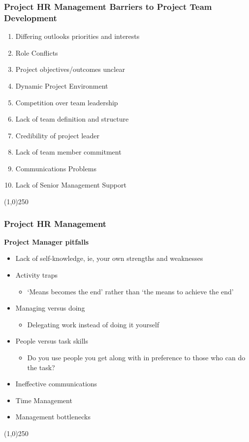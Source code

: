 \begin{frame}
\frametitle{Project HR Management \hfill Barriers to Project Team Development}
\begin{enumerate}
	\item Differing outlooks priorities and interests
	\item Role Conflicts
	\item Project objectives/outcomes unclear
	\item Dynamic Project Environment
	\item Competition over team leadership
	\item Lack of team definition and structure
	\item Credibility of project leader
	\item Lack of team member commitment
	\item Communications Problems
	\item Lack of Senior Management Support
\end{enumerate}
\end{frame}\begin{center}\line(1,0){250}\end{center}
 
 
\begin{frame}
\frametitle{Project HR Management}
\textbf{Project Manager pitfalls}
\begin{itemize}
	\item Lack of self-knowledge, ie, your own strengths and weaknesses
	\item Activity traps\\
		\begin{itemize}
			\item  `Means becomes the end' rather than `the means to achieve the end'
		\end{itemize}
	\item Managing versus doing\\
		\begin{itemize}
			\item  Delegating work instead of doing it yourself
		\end{itemize}
	\item	People versus task skills\\
		\begin{itemize}
			\item  Do you use people you get along with in preference to those who can do the task?
		\end{itemize}
	\item Ineffective communications\\
	\item Time Management\\
	\item Management bottlenecks\\
\end{itemize}
\end{frame}\begin{center}\line(1,0){250}\end{center}

